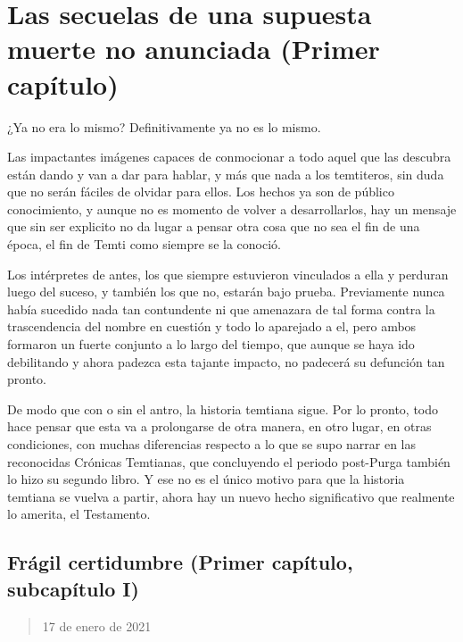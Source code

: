 \documentclass[
  spanish,
]{book}
\begin{document}
\hypertarget{las-secuelas-de-una-supuesta-muerte-no-anunciada-primer-capuxedtulo}{%
\chapter{Las secuelas de una supuesta muerte no anunciada (Primer capítulo)}\label{las-secuelas-de-una-supuesta-muerte-no-anunciada-primer-capuxedtulo}}

¿Ya no era lo mismo? Definitivamente ya no es lo mismo.

Las impactantes imágenes capaces de conmocionar a todo aquel que las descubra están dando y van a dar para hablar, y más que nada a los temtiteros, sin duda que no serán fáciles de olvidar para ellos. Los hechos ya son de público conocimiento, y aunque no es momento de volver a desarrollarlos, hay un mensaje que sin ser explicito no da lugar a pensar otra cosa que no sea el fin de una época, el fin de Temti como siempre se la conoció.

Los intérpretes de antes, los que siempre estuvieron vinculados a ella y perduran luego del suceso, y también los que no, estarán bajo prueba. Previamente nunca había sucedido nada tan contundente ni que amenazara de tal forma contra la trascendencia del nombre en cuestión y todo lo aparejado a el, pero ambos formaron un fuerte conjunto a lo largo del tiempo, que aunque se haya ido debilitando y ahora padezca esta tajante impacto, no padecerá su defunción tan pronto.

De modo que con o sin el antro, la historia temtiana sigue. Por lo pronto, todo hace pensar que esta va a prolongarse de otra manera, en otro lugar, en otras condiciones, con muchas diferencias respecto a lo que se supo narrar en las reconocidas Crónicas Temtianas, que concluyendo el periodo post-Purga también lo hizo su segundo libro. Y ese no es el único motivo para que la historia temtiana se vuelva a partir, ahora hay un nuevo hecho significativo que realmente lo amerita, el Testamento.

\hypertarget{fruxe1gil-certidumbre-primer-capuxedtulo-subcapuxedtulo-i}{%
\section{Frágil certidumbre (Primer capítulo, subcapítulo I)}\label{fruxe1gil-certidumbre-primer-capuxedtulo-subcapuxedtulo-i}}

\begin{quote}
17 de enero de 2021
\end{quote}
\end{document}
